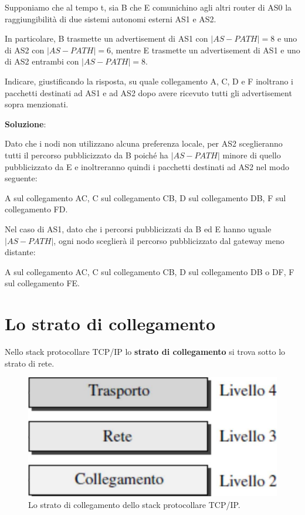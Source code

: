 \documentclass[11pt,a4paper,oneside]{book}
\theoremstyle{definition}
\begin{document}
\begin{enumerate}
	      Supponiamo che al tempo t, sia B che E comunichino agli altri router di AS0
	      la raggiungibilità di due sistemi autonomi esterni AS1 e AS2.

	      In particolare, B
	      trasmette un advertisement di AS1 con $|AS-PATH| = 8$ e uno di AS2 con $|AS-PATH| = 6$, mentre E trasmette un advertisement di AS1 e uno di AS2 entrambi con $|AS-PATH| = 8$.

	      Indicare, giustificando la risposta,  su quale collegamento A, C, D e F
	      inoltrano i pacchetti destinati ad AS1 e ad AS2 dopo avere ricevuto tutti gli
	      advertisement sopra menzionati.

	      \textbf{Soluzione}:

	      Dato che i nodi non utilizzano alcuna preferenza locale, per AS2 sceglieranno tutti il percorso pubblicizzato da B poiché ha $|AS-PATH|$ minore di quello pubblicizzato da E e inoltreranno quindi i pacchetti destinati ad AS2 nel modo seguente:

	      A sul collegamento AC,\newline
	      C sul collegamento CB,\newline
	      D sul collegamento DB,\newline
	      F sul collegamento FD.\newline

	      Nel caso di AS1, dato che i percorsi pubblicizzati da B ed E hanno uguale $|AS-PATH|$, ogni nodo sceglierà il percorso pubblicizzato dal gateway meno distante:

	      A sul collegamento AC,\newline
	      C sul collegamento CB,\newline
	      D sul collegamento DB o DF,\newline
	      F sul collegamento FE.

	      \pagebreak
\end{enumerate}

\section{Lo strato di collegamento}
Nello stack protocollare TCP/IP lo \textbf{strato di collegamento} si trova sotto lo strato di rete.

\begin{figure}[!h]
	\includegraphics[scale=0.2]{Immagini/Ip.png}
	\centering
	\caption{Lo strato di collegamento dello stack protocollare TCP/IP.}
\end{figure}
\end{document}
